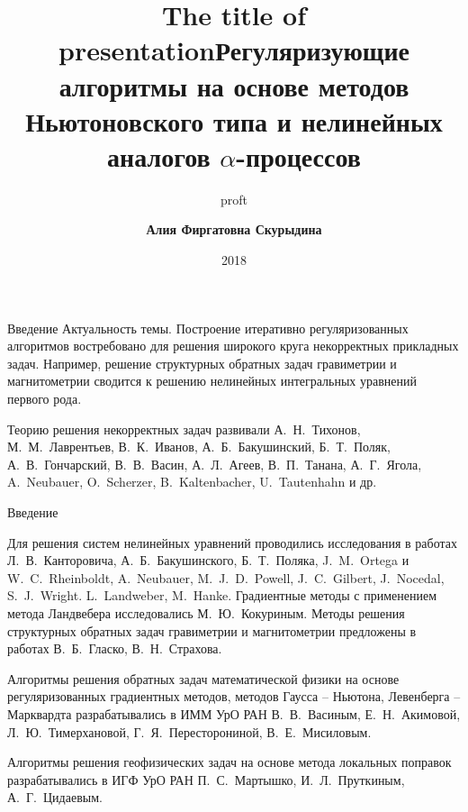 \documentclass[10pt,pdf, mathserif, hyperref={unicode}]{beamer}
\title{The title of presentation}
\author{proft}
\date{2018}
\begin{document}
	
	\small
	\footnotesize
	
\title[\hspace*{55mm}{\insertpagenumber /\pageref{lastpage}}]{{\small\textbf{Регуляризующие алгоритмы на основе методов 
Ньютоновского типа и нелинейных аналогов $\alpha$-процессов}}}
\author[\insertlogo{\em{Алия Фиргатовна Скурыдина}}%
\hspace*{60mm}]{\textbf{\color{blue}Алия Фиргатовна Скурыдина}}
\frame{\titlepage}

\begin{frame}{Введение}
%	
	{\color{blue}Актуальность темы.} Построение итеративно регуляризованных алгоритмов востребовано для решения широкого круга некорректных прикладных задач. Например, решение структурных обратных задач гравиметрии и магнитометрии сводится к решению нелинейных интегральных уравнений первого рода.
	
	\smallskip
	Теорию решения некорректных задач развивали А.~Н.~Тихонов, М.~М.~Лаврентьев, В.~К.~Иванов, А.~Б.~Бакушинский, Б.~Т.~Поляк, А.~В.~Гончарский, В.~В.~Васин, А.~Л.~Агеев, В.~П.~Танана, А.~Г.~Ягола, A.~Neubauer, O.~Scherzer, B.~Kaltenbacher, U.~Tautenhahn и др.
	
\end{frame}

\begin{frame}{Введение}
	
	Для решения систем нелинейных уравнений проводились исследования в работах Л.~В.~Канторовича, А.~Б.~Бакушинского, Б.~Т.~Поляка, J.~M.~Ortega и W.~C.~Rheinboldt,	A.~Neubauer, M.~J.~D.~Powell, 	J.~C.~Gilbert, J.~Nocedal, S.~J.~Wright.
	L.~Landweber, M.~Hanke. Градиентные методы с применением
	метода Ландвебера исследовались М.~Ю.~Кокуриным.
	Методы решения структурных обратных задач гравиметрии и магнитометрии предложены в работах В.~Б.~Гласко, В.~Н.~Страхова. 
	\vspace*{0.3cm}
	
	Алгоритмы решения обратных задач математической физики на основе регуляризованных градиентных методов, 
методов Гаусса -- Ньютона, Левенберга -- Марквардта разрабатывались в ИММ УрО РАН В.~В.~Васиным, Е.~Н.~Акимовой, 
Л.~Ю.~Тимерхановой, Г.~Я.~Пересторониной, В.~Е.~Мисиловым. 

Алгоритмы решения геофизических задач на основе метода локальных поправок разрабатывались в ИГФ УрО РАН 
П.~С.~Мартышко, И.~Л.~Пруткиным, А.~Г.~Цидаевым.  
\end{frame}
\end{document}
